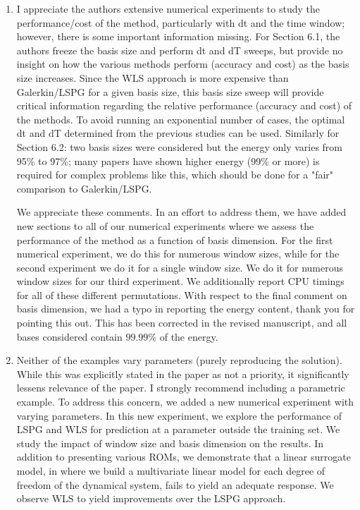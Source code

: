 \documentclass[3p,computermodern,10pt]{elsarticle}
\begin{document}
\begin{enumerate}
\item I appreciate the authors extensive numerical experiments to study the performance/cost of the method, particularly with dt and the time window; however, there is some important information missing. For Section 6.1, the authors freeze the basis size and perform dt and dT sweeps, but provide no insight on how the various methods perform (accuracy and cost) as the basis size increases. Since the WLS approach is more expensive than Galerkin/LSPG for a given basis size, this basis size sweep will provide critical information regarding the relative performance (accuracy and cost) of the methods. To avoid running an exponential number of cases, the optimal dt and dT determined from the previous studies can be used. Similarly for Section 6.2: two basis sizes were considered but the energy only varies from 95\% to 97\%; many papers have shown higher energy (99\% or more) is required for complex problems like this, which should be done for a "fair" comparison to Galerkin/LSPG.

{\color{red} We appreciate these comments. In an effort to address them, we have added new sections to all of our numerical experiments where we assess the performance of the method as a function of basis dimension. For the first numerical experiment, we do this for numerous window sizes, while for the second experiment we do it for a single window size. We do it for numerous window sizes for our third experiment. We additionally report CPU timings for all of these different permutations. With respect to the final comment on basis dimension, we had a typo in reporting the energy content, thank you for pointing this out. This has been corrected in the revised manuscript, and all bases considered contain $99.99\%$ of the energy.}
 
\item Neither of the examples vary parameters (purely reproducing the solution). While this was explicitly stated in the paper as not a priority, it significantly lessens relevance of the paper. I strongly recommend including a parametric example.
{\color{red} To address this concern, we added a new numerical experiment with varying parameters.  In this new experiment, we explore the performance of LSPG and WLS for prediction at a parameter outside the training set. We study the impact of window size and basis dimension on the results. In addition to presenting various ROMs, we demonstrate that a linear surrogate model, in where we build a multivariate linear model for each degree of freedom of the dynamical system, fails to yield an adequate response. We observe WLS to yield improvements over the LSPG approach.}   

\end{enumerate}


\end{document}
